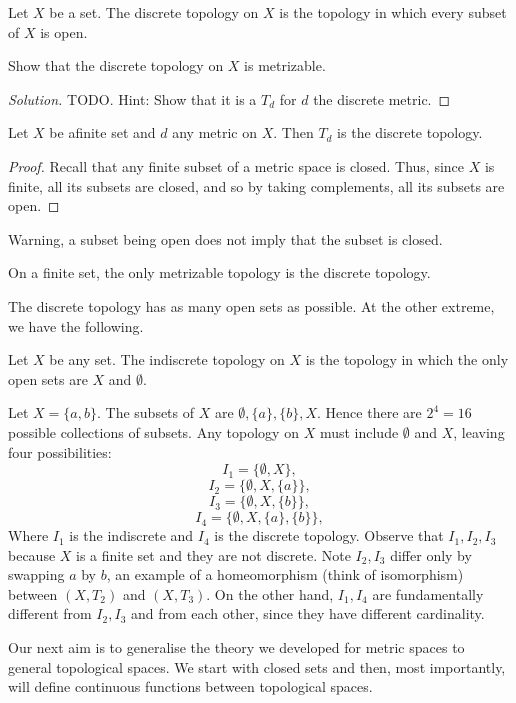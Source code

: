 \begin{definition}
  Let $X$ be a set. The discrete topology on $X$ is the topology in which every
  subset of $X$ is open.
  \label{<+label+>}
\end{definition}
\begin{exercise}
  Show that the discrete topology on $X$ is metrizable.
\end{exercise}
\begin{proof}[Solution]
  TODO. Hint: Show that it is a $T_d$ for $d$ the discrete metric.
\end{proof}
\begin{proposition}
  Let $X$ be afinite set and $d$ any metric on $X$. Then $T_d$ is the discrete
  topology.
  \label{<+label+>}
\end{proposition}
\begin{proof}
  Recall that any finite subset of a metric space is closed. Thus, since $X$ is
  finite, all its subsets are closed, and so by taking complements, all its
  subsets are open.
\end{proof}
\begin{remark}
  Warning, a subset being open does not imply that the subset is closed.
  \label{<+label+>}
\end{remark}

\begin{corollary}
  On a finite set, the only metrizable topology is the discrete topology.
  \label{<+label+>}
\end{corollary}
The discrete topology has as many open sets as possible.  At the other extreme,
we have the following.
\begin{definition}
  Let $X$ be any set. The indiscrete topology on $X$ is the topology in which
  the only open sets are $X$ and $\emptyset$.
  \label{<+label+>}
\end{definition}
\begin{example}
  Let $X=\{a,b\}$. The subsets of $X$ are $\emptyset, \{a\},\{b\},X$. Hence
  there are $2^4=16$ possible collections of subsets. Any topology on $X$ must
  include $\emptyset$ and $X$, leaving four possibilities: 
  \[I_1=\{\emptyset, X\},\]
  \[I_2=\{\emptyset, X, \{a\} \},\]
  \[I_3=\{\emptyset, X, \{b\} \},\]
  \[I_4=\{\emptyset, X,\{a\}, \{b\} \},\]
  Where $I_1$ is the indiscrete and $I_4$ is the discrete topology. Observe that
  $I_1,I_2,I_3$ because $X$ is a finite set and they are not discrete. Note
  $I_2,I_3$ differ only by swapping $a$ by $b$, an example of a homeomorphism
  (think of isomorphism) between $(X,T_2)$ and $(X,T_3)$. On the other hand,
  $I_1,I_4$ are fundamentally different from $I_2,I_3$ and from each other,
  since they have different cardinality.
\end{example}
Our next aim is to generalise the theory we developed for metric spaces to
general topological spaces. We start with closed sets and then, most
importantly, will define continuous functions between topological spaces.

